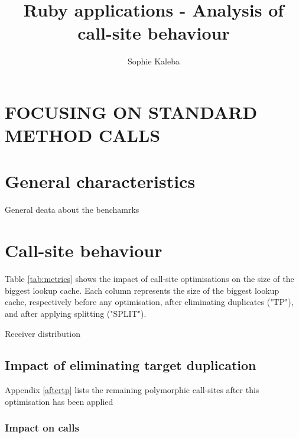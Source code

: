 \documentclass[10pt, sigplan, preprint]{acmart}
\begin{document}
\title{Ruby applications - Analysis of call-site behaviour}

\author{Sophie Kaleba}

\maketitle


\section{FOCUSING ON STANDARD METHOD CALLS}

\section{General characteristics}

\begin{table}[!h]
	\caption{General deata about the benchamrks}
	\centering
	\tiny
	\Metrics
	\label{tab:metrics}
	\end{table}

\section{Call-site behaviour}

Table \ref{tab:metrics} shows the impact of call-site optimisations on the size of the biggest lookup cache.
Each column represents the size of the biggest lookup cache, respectively before any optimisation, after eliminating duplicates ("TP"), and after applying splitting ("SPLIT").

\begin{table}[!h]
	\caption{Receiver distribution}
	\centering
	\tiny
	\Distribution
	\label{tab:distribution}
\end{table}

\subsection{Impact of eliminating target duplication}

Appendix \ref{aftertp} lists the remaining polymorphic call-sites after this optimisation has been applied

\subsubsection{\textbf{Impact on calls}}
\end{document}

